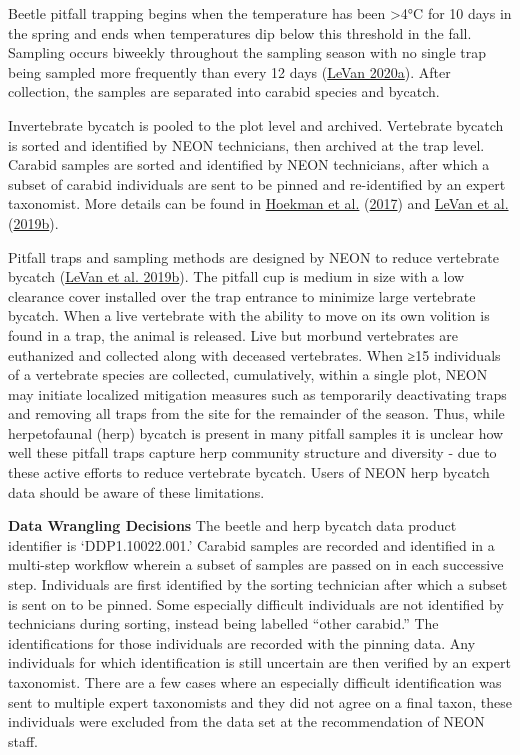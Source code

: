 \documentclass[
  12pt,
]{article}
\begin{document}
Beetle pitfall trapping begins when the temperature has been \textgreater4°C for 10 days in the spring and ends when temperatures dip below this threshold in the fall. Sampling occurs biweekly throughout the sampling season with no single trap being sampled more frequently than every 12 days (\protect\hyperlink{ref-LeVan2020}{LeVan 2020a}). After collection, the samples are separated into carabid species and bycatch.

Invertebrate bycatch is pooled to the plot level and archived. Vertebrate bycatch is sorted and identified by NEON technicians, then archived at the trap level. Carabid samples are sorted and identified by NEON technicians, after which a subset of carabid individuals are sent to be pinned and re-identified by an expert taxonomist. More details can be found in \protect\hyperlink{ref-hoekman2017design}{Hoekman et al.} (\protect\hyperlink{ref-hoekman2017design}{2017}) and \protect\hyperlink{ref-LeVan2019}{LeVan et al.} (\protect\hyperlink{ref-LeVan2019}{2019b}).

Pitfall traps and sampling methods are designed by NEON to reduce vertebrate bycatch (\protect\hyperlink{ref-LeVan2019}{LeVan et al. 2019b}). The pitfall cup is medium in size with a low clearance cover installed over the trap entrance to minimize large vertebrate bycatch. When a live vertebrate with the ability to move on its own volition is found in a trap, the animal is released. Live but morbund vertebrates are euthanized and collected along with deceased vertebrates. When ≥15 individuals of a vertebrate species are collected, cumulatively, within a single plot, NEON may initiate localized mitigation measures such as temporarily deactivating traps and removing all traps from the site for the remainder of the season. Thus, while herpetofaunal (herp) bycatch is present in many pitfall samples it is unclear how well these pitfall traps capture herp community structure and diversity - due to these active efforts to reduce vertebrate bycatch. Users of NEON herp bycatch data should be aware of these limitations.

\textbf{Data Wrangling Decisions} The beetle and herp bycatch data product identifier is `DDP1.10022.001.' Carabid samples are recorded and identified in a multi-step workflow wherein a subset of samples are passed on in each successive step. Individuals are first identified by the sorting technician after which a subset is sent on to be pinned. Some especially difficult individuals are not identified by technicians during sorting, instead being labelled ``other carabid.'' The identifications for those individuals are recorded with the pinning data. Any individuals for which identification is still uncertain are then verified by an expert taxonomist. There are a few cases where an especially difficult identification was sent to multiple expert taxonomists and they did not agree on a final taxon, these individuals were excluded from the data set at the recommendation of NEON staff.
\end{document}
